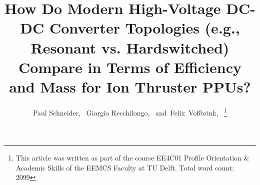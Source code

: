 \documentclass[journal]{IEEEtran}
\begin{document}
%
\title{How Do Modern High-Voltage DC-DC Converter Topologies (e.g., Resonant vs. Hardswitched) Compare in Terms of Efficiency and Mass for Ion Thruster PPUs?}


\author{Paul Schneider,~
        Giorgio Recchilongo,~
        and~Felix~Voßbrink,~%
\thanks{This article was written as part of the course EE4C01 Profile Orientation \& Academic Skills of the EEMCS Faculty at TU Delft. Total word count: 2099}}

% 
%













\maketitle
\end{document}
